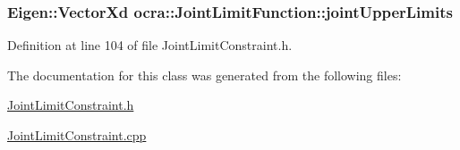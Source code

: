 \subsubsection[{\texorpdfstring{joint\+Upper\+Limits}{jointUpperLimits}}]{\setlength{\rightskip}{0pt plus 5cm}Eigen\+::\+Vector\+Xd ocra\+::\+Joint\+Limit\+Function\+::joint\+Upper\+Limits\hspace{0.3cm}{\ttfamily [protected]}}\hypertarget{classocra_1_1JointLimitFunction_a8ea9cd9be8cc3eb55d7d988ba8c5f7e4}{}\label{classocra_1_1JointLimitFunction_a8ea9cd9be8cc3eb55d7d988ba8c5f7e4}


Definition at line 104 of file Joint\+Limit\+Constraint.\+h.



The documentation for this class was generated from the following files\+:\begin{DoxyCompactItemize}
\item 
\hyperlink{JointLimitConstraint_8h}{Joint\+Limit\+Constraint.\+h}\item 
\hyperlink{JointLimitConstraint_8cpp}{Joint\+Limit\+Constraint.\+cpp}\end{DoxyCompactItemize}
